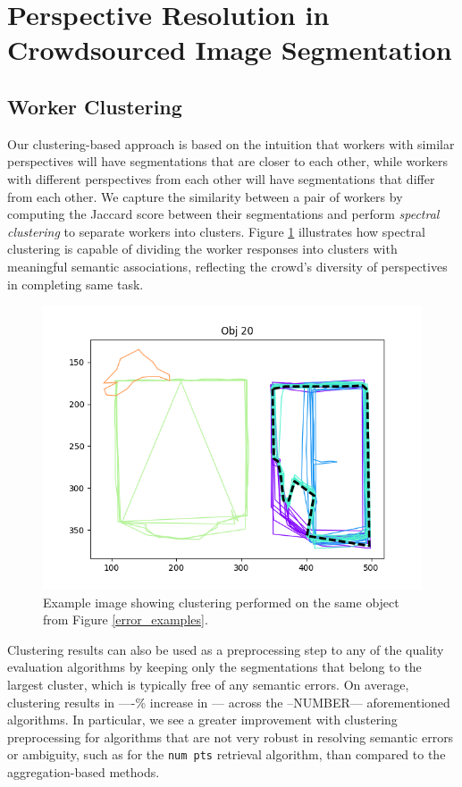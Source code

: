 \section{Perspective Resolution in Crowdsourced Image Segmentation}
\subsection{Worker Clustering}
Our clustering-based approach is based on the intuition that workers with similar perspectives  will have segmentations that are closer to each other, while workers with different perspectives from each other will have segmentations that differ from each other. We capture the similarity between a pair of workers by computing the Jaccard score between their segmentations and perform {\em spectral clustering} to separate workers into clusters. Figure \ref{cluster_example} illustrates how spectral clustering is capable of dividing the worker responses into clusters with meaningful semantic associations, reflecting the crowd's diversity of perspectives in completing same task.
    \begin{figure}[ht!]
      \centering
      \includegraphics[width=\textwidth]{plots/20.png}
      \caption{Example image showing clustering performed on the same object from Figure \ref{error_examples}.}
      \label{cluster_example}
    \end{figure}
\par Clustering results can also be used as a preprocessing step to any of the quality evaluation algorithms by keeping only the segmentations that belong to the largest cluster, which is typically free of any semantic errors. On average, clustering results in ----\% increase in --- across the --NUMBER--- aforementioned algorithms. In particular, we see a greater improvement with clustering preprocessing for algorithms that are not very robust in resolving semantic errors or ambiguity, such as for the \texttt{num pts} retrieval algorithm, than compared to the aggregation-based methods. 
